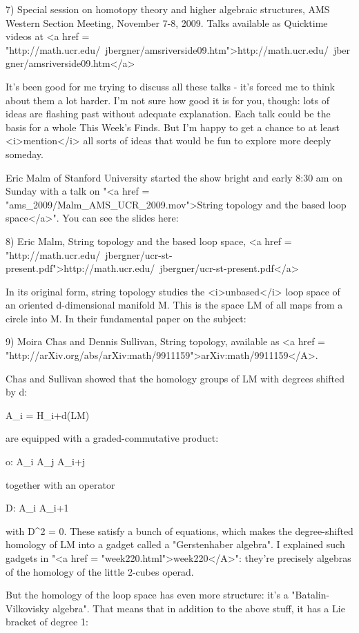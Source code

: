 7) Special session on homotopy theory and higher algebraic structures,
AMS Western Section Meeting, November 7-8, 2009.  Talks available as
Quicktime videos at <a href =
"http://math.ucr.edu/~jbergner/amsriverside09.htm">http://math.ucr.edu/~jbergner/amsriverside09.htm</a>

It's been good for me trying to discuss all these talks - it's forced
me to think about them a lot harder.  I'm not sure how good it is for
you, though: lots of ideas are flashing past without adequate
explanation.  Each talk could be the basis for a whole This Week's
Finds.  But I'm happy to get a chance to at least <i>mention</i> all sorts
of ideas that would be fun to explore more deeply someday.

Eric Malm of Stanford University started the show bright and early
8:30 am on Sunday with a talk on 
"<a href = "ams_2009/Malm_AMS_UCR_2009.mov">String topology and the based loop
space</a>".  You can see the slides here:

8) Eric Malm, String topology and the based loop space,
<a href = "http://math.ucr.edu/~jbergner/ucr-st-present.pdf">http://math.ucr.edu/~jbergner/ucr-st-present.pdf</a>

In its original form, string topology studies the <i>unbased</i> loop space
of an oriented d-dimensional manifold M.  This is the space LM of all
maps from a circle into M.  In their fundamental paper on the subject:

9) Moira Chas and Dennis Sullivan, String topology, available
as <a href = "http://arXiv.org/abs/arXiv:math/9911159">arXiv:math/9911159</A>.

Chas and Sullivan showed that the homology groups of LM with degrees
shifted by d:

A_{i} = H_{i+d}(LM)

are equipped with a graded-commutative product:

o: A_{i} \otimes  A_{j} \to  A_{i+j}

together with an operator

D: A_{i} \to  A_{i+1}

with D^{2} = 0.  These satisfy a bunch of equations, which
makes the degree-shifted homology of LM into a gadget called a
"Gerstenhaber algebra".  I explained such gadgets in
"<a href = "week220.html">week220</A>": they're precisely
algebras of the homology of the little 2-cubes operad.

But the homology of the loop space has even more structure: it's a
"Batalin-Vilkovisky algebra".  That means that in addition
to the above stuff, it has a Lie bracket of degree 1:

